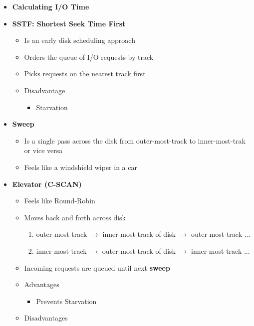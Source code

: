 \documentclass[12pt]{article}
\begin{document}
\begin{itemize}
    \item \textbf{Calculating I/O Time}

    \item \textbf{SSTF: Shortest Seek Time First}

    \begin{itemize}
        \item Is an early disk scheduling approach
        \item Orders the queue of I/O requests by track
        \item Picks requests on the nearest track first
        \item Disadvantage
        \begin{itemize}
            \item Starvation
        \end{itemize}
    \end{itemize}

    \item \textbf{Sweep}
    \begin{itemize}
        \item Is a single pass across the disk from outer-most-track to inner-most-trak or vice versa
        \item Feels like a windshield wiper in a car
    \end{itemize}

    \item \textbf{Elevator (C-SCAN)}

    \begin{itemize}
        \item Feels like Round-Robin
        \item Moves back and forth across disk
        \begin{enumerate}[1.]
            \item outer-most-track $\to$ inner-most-track of disk $\to$ outer-most-track ...
            \item inner-most-track  $\to$ outer-most-track of disk $\to$ inner-most-track ...
        \end{enumerate}
        \item Incoming requests are queued until next \textbf{sweep}
        \item Advantages
        \begin{itemize}
            \item Prevents Starvation
        \end{itemize}
        \item Disadvantages
    \end{itemize}


\end{itemize}
\end{document}
